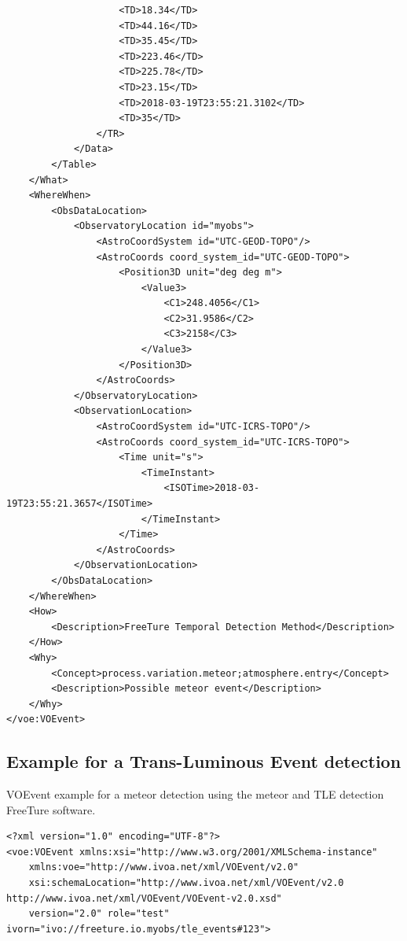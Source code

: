 \documentclass[referee,a4paper,12pt,traditabstract]{swsc}
\begin{document}
\begin{linenumbers}
{\begin{verbatim}
                    <TD>18.34</TD>
                    <TD>44.16</TD>
                    <TD>35.45</TD>
                    <TD>223.46</TD>
                    <TD>225.78</TD>
                    <TD>23.15</TD>
                    <TD>2018-03-19T23:55:21.3102</TD>
                    <TD>35</TD>
                </TR>
            </Data>
        </Table>
    </What>
    <WhereWhen>
        <ObsDataLocation>
            <ObservatoryLocation id="myobs">
                <AstroCoordSystem id="UTC-GEOD-TOPO"/>
                <AstroCoords coord_system_id="UTC-GEOD-TOPO">
                    <Position3D unit="deg deg m">
                        <Value3>
                            <C1>248.4056</C1>
                            <C2>31.9586</C2>
                            <C3>2158</C3>
                        </Value3>
                    </Position3D>
                </AstroCoords>
            </ObservatoryLocation>
            <ObservationLocation>
                <AstroCoordSystem id="UTC-ICRS-TOPO"/>
                <AstroCoords coord_system_id="UTC-ICRS-TOPO">
                    <Time unit="s">
                        <TimeInstant>
                            <ISOTime>2018-03-19T23:55:21.3657</ISOTime>
                        </TimeInstant>
                    </Time>
                </AstroCoords>
            </ObservationLocation>
        </ObsDataLocation>
    </WhereWhen>
    <How>
        <Description>FreeTure Temporal Detection Method</Description>
    </How>
    <Why>
        <Concept>process.variation.meteor;atmosphere.entry</Concept>
        <Description>Possible meteor event</Description>
    </Why>
</voe:VOEvent>
\end{verbatim}
}

\subsection{Example for a Trans-Luminous Event detection}
\label{appendix-xml-voevent-tle-freeture}
VOEvent example for a meteor detection using the meteor and TLE detection FreeTure \cite{2014pim4.conf...39A} software.

{\tiny 
\begin{verbatim}
<?xml version="1.0" encoding="UTF-8"?>
<voe:VOEvent xmlns:xsi="http://www.w3.org/2001/XMLSchema-instance"
    xmlns:voe="http://www.ivoa.net/xml/VOEvent/v2.0"
    xsi:schemaLocation="http://www.ivoa.net/xml/VOEvent/v2.0 http://www.ivoa.net/xml/VOEvent/VOEvent-v2.0.xsd"
    version="2.0" role="test" ivorn="ivo://freeture.io.myobs/tle_events#123">


\end{verbatim}}
\end{linenumbers}
\end{document}
